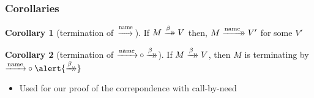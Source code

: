 \documentclass[dvipdfmx,cjk,xcolor=dvipsnames,envcountsect,notheorems,12pt]{beamer}
\theoremstyle{definition}
\newtheorem{corollary}{Corollary}
\newcommand{\xtwoheadrightarrow}[2][]{%
  \xrightarrow[#1]{#2}\mathrel{\mkern-14mu}\rightarrow
}
\newcommand{\CALLBYNAME}{\xrightarrow{\mathrm{name}}}
\newcommand{\RTCLOSFULLBETA}{\xtwoheadrightarrow{\beta}}
\newcommand{\RTCLOSCALLBYNAME}{\xtwoheadrightarrow{\mathrm{name}}}
\begin{document}
\begin{frame}
	\frametitle{Corollaries}
	\Large
	\begin{corollary}[termination of $\CALLBYNAME$]
		If $M \RTCLOSFULLBETA V$ then, $M \RTCLOSCALLBYNAME V'$ for some $V'$
	\end{corollary}
	\begin{corollary}[termination of ${\CALLBYNAME}\circ{\RTCLOSFULLBETA}$]
		If $M \RTCLOSFULLBETA V$, then
		$M$ is terminating by ${\CALLBYNAME}\circ{\alert{\RTCLOSFULLBETA}}$
	\end{corollary}
	\begin{itemize}
		\item Used for our proof of the correpondence with call-by-need
	\end{itemize}
\end{frame}
\end{document}
